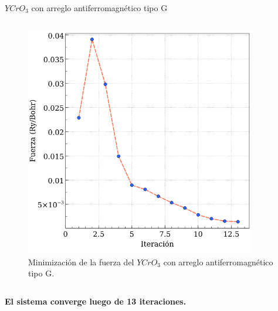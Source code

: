 \begin{frame}{$YCrO_{3}$ con arreglo antiferromagn\'etico tipo G}
\begin{columns}[t]
\begin{figure}[H]
            \includegraphics[width=0.9\textwidth]{contenido/resultados/img_resultados/fuerza_YCO_G.png}
            \caption{Minimizaci\'on de la fuerza del $YCrO_{3}$ con arreglo 
                antiferromagn\'etico tipo G.}
        \end{figure}
    \end{columns}
\centering
\textbf{El sistema converge luego de 13 iteraciones.}
\end{frame}